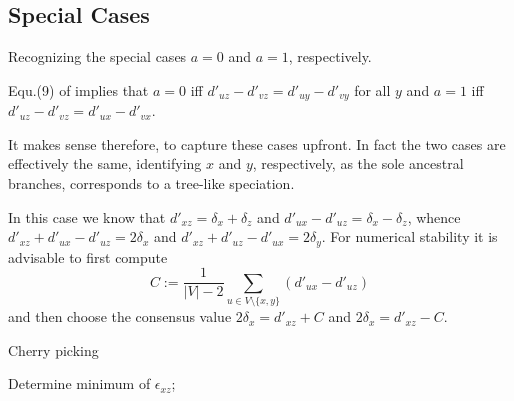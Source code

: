 \documentclass{article}
\newcommand{\NR}[1]{\begingroup\color{orange}#1\endgroup}
\begin{document}
\subsection*{Special Cases} 

Recognizing the special cases $a =0$ and $a =1$, respectively.

Equ.(9) of \cite{Prohaska:17a} implies that $a=0$ iff 
$d'_{uz}-d'_{vz} = d'_{uy}-d'_{vy}$ for all $y$ and $a=1$ iff 
$d'_{uz}-d'_{vz} = d'_{ux}-d'_{vx}$.

It makes sense therefore, to capture these cases upfront. In fact the two
cases are effectively the same, identifying $x$ and $y$, respectively, as
the sole ancestral branches, corresponds to a tree-like speciation. 

In this case we know that $d'_{xz}=\delta_x+\delta_z$ and 
$d'_{ux}-d'_{uz}=\delta_x-\delta_z$, whence 
$d'_{xz}+d'_{ux}-d'_{uz}=2\delta_x$
and 
$d'_{xz}+d'_{uz}-d'_{ux}=2\delta_y$. 
For numerical stability it is advisable to first compute 
\begin{equation} 
  C := \frac{1}{|V|-2} \sum_{u\in V\setminus\{x,y\}} (d'_{ux}-d'_{uz})
\end{equation} 
and then choose the consensus value $2\delta_x = d'_{xz}+C$ and 
$2\delta_x = d'_{xz}-C$.



\begin{algorithm}[H]
\caption{\NR{Cherry picking}}
\label{alg:cherries}
 \SetAlgoLined
 Determine minimum of $\epsilon_{xz}$;
\end{algorithm}


      
   
\end{document}

